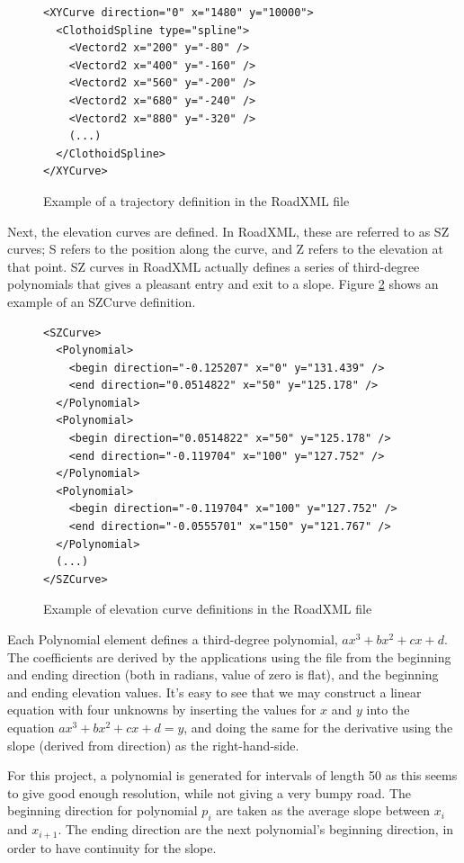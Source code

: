\begin{figure}[ht]
\centering
\begin{verbatim}
<XYCurve direction="0" x="1480" y="10000">
  <ClothoidSpline type="spline">
    <Vectord2 x="200" y="-80" />
    <Vectord2 x="400" y="-160" />
    <Vectord2 x="560" y="-200" />
    <Vectord2 x="680" y="-240" />
    <Vectord2 x="880" y="-320" />
    (...)
  </ClothoidSpline>
</XYCurve>
\end{verbatim}
\caption{Example of a trajectory definition in the RoadXML file}
\label{fig:roadxml_controlpoints}
\end{figure}

Next, the elevation curves are defined. In RoadXML, these are referred to as SZ curves; S refers to the position along the curve, and Z refers to the elevation at that point. SZ curves in RoadXML actually defines a series of third-degree polynomials that gives a pleasant entry and exit to a slope. Figure \ref{fig:roadxml_elevation_curves} shows an example of an SZCurve definition. 

\begin{figure}[ht]
\centering
\begin{verbatim}
<SZCurve>
  <Polynomial>
    <begin direction="-0.125207" x="0" y="131.439" />
    <end direction="0.0514822" x="50" y="125.178" />
  </Polynomial>
  <Polynomial>
    <begin direction="0.0514822" x="50" y="125.178" />
    <end direction="-0.119704" x="100" y="127.752" />
  </Polynomial>
  <Polynomial>
    <begin direction="-0.119704" x="100" y="127.752" />
    <end direction="-0.0555701" x="150" y="121.767" />
  </Polynomial>
  (...)
</SZCurve>
\end{verbatim}
\caption{Example of elevation curve definitions in the RoadXML file}
\label{fig:roadxml_elevation_curves}
\end{figure}

Each Polynomial element defines a third-degree polynomial, $ax^3+bx^2+cx+d$. The coefficients are derived by the applications using the file from the beginning and ending direction (both in radians, value of zero is flat), and the beginning and ending elevation values. It's easy to see that we may construct a linear equation with four unknowns by inserting the values for $x$ and $y$ into the equation $ax^3+bx^2+cx+d = y$, and doing the same for the derivative using the slope (derived from direction) as the right-hand-side.

For this project, a polynomial is generated for intervals of length 50 as this seems to give good enough resolution, while not giving a very bumpy road. The beginning direction for polynomial $p_i$ are taken as the average slope between $x_i$ and $x_{i+1}$. The ending direction are the next polynomial's beginning direction, in order to have continuity for the slope.


